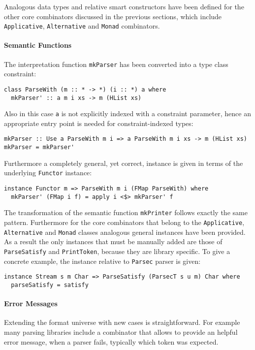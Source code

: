 \documentclass[../Thesis.tex]{subfiles}
\begin{document}
	Analogous data types and relative smart constructors 
	have been defined for the other core combinators
	discussed in the previous sections, which include 
	\texttt{Applicative}, \texttt{Alternative} and \texttt{Monad} combinators.

	\paragraph{Semantic Functions}
	\label{par:SemanticsFun}
	The interpretation function \texttt{mkParser} has been converted into
	a type class constraint:
	
\begin{verbatim}
class ParseWith (m :: * -> *) (i :: *) a where
  mkParser' :: a m i xs -> m (HList xs)
\end{verbatim}

	Also in this case \texttt{a} is not explicitly indexed with a constraint
	parameter, hence an appropriate entry point is needed
	for constraint-indexed types:

\begin{verbatim}
mkParser :: Use a ParseWith m i => a ParseWith m i xs -> m (HList xs)
mkParser = mkParser'
\end{verbatim}

	Furthermore a completely general, yet correct, instance is given
	in terms of the underlying \texttt{Functor} instance:
\begin{verbatim}
instance Functor m => ParseWith m i (FMap ParseWith) where
  mkParser' (FMap i f) = apply i <$> mkParser' f
\end{verbatim}

	The transformation of the semantic function \texttt{mkPrinter}
	follows exactly the same pattern.
	Furthermore for the core combinators that belong to the
	\texttt{Applicative}, \texttt{Alternative} and \texttt{Monad} classes
	analogous general instances have been provided.
	As a result the only instances that must be manually added
	are those of \texttt{ParseSatisfy}	and \texttt{PrintToken}, 
	because they are library specific.
	To give a concrete example, the instance relative to
	\texttt{Parsec} \cite{Parsec} parser is given:

\begin{verbatim}
instance Stream s m Char => ParseSatisfy (ParsecT s u m) Char where
  parseSatisfy = satisfy
\end{verbatim}

	\paragraph{Error Messages}
	Extending the format universe with new cases is straightforward.
	For example many parsing libraries include a combinator 
	that allows to provide an helpful error message,
	when a parser fails, 	typically which token was expected.
\end{document}
